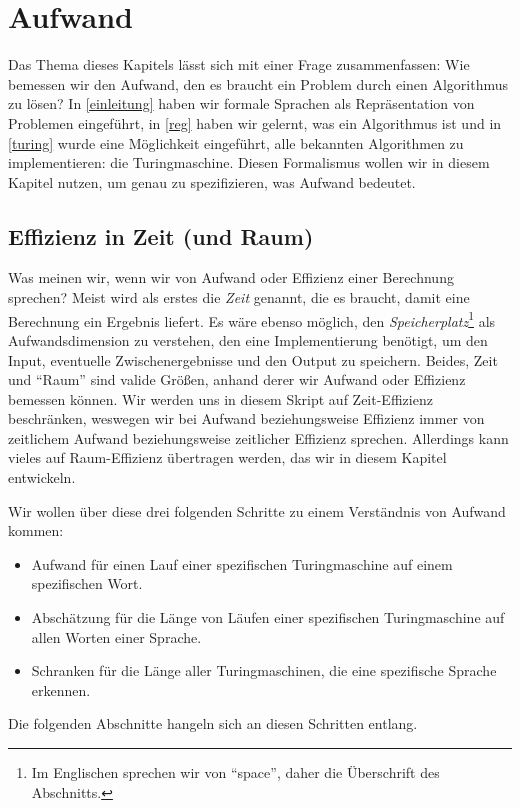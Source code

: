 \chapter{Aufwand}
Das Thema dieses Kapitels lässt sich mit einer Frage zusammenfassen:
Wie bemessen wir den Aufwand,
den es braucht ein Problem durch einen Algorithmus zu lösen?
In \autoref{einleitung} haben wir formale Sprachen als Repräsentation von Problemen eingeführt,
in \autoref{reg} haben wir gelernt, was ein Algorithmus ist und
in \autoref{turing} wurde eine Möglichkeit eingeführt,
alle bekannten Algorithmen zu implementieren:
die Turingmaschine.
Diesen Formalismus wollen wir in diesem Kapitel nutzen,
um genau zu spezifizieren,
was Aufwand bedeutet.

\section{Effizienz in Zeit (und Raum)}

Was meinen wir, wenn wir von Aufwand oder Effizienz einer Berechnung sprechen?
Meist wird als erstes die \emph{Zeit} genannt,
die es braucht,
damit eine Berechnung ein Ergebnis liefert.
Es wäre ebenso möglich,
den \emph{Speicherplatz}\footnote{
    Im Englischen sprechen wir von ``space'', daher die Überschrift des Abschnitts.}
als Aufwandsdimension zu verstehen,
den eine Implementierung benötigt,
um den Input,
eventuelle Zwischenergebnisse
und den Output zu speichern.
Beides, Zeit und ``Raum'' sind valide Größen,
anhand derer wir Aufwand oder Effizienz bemessen können.
Wir werden uns in diesem Skript auf Zeit-Effizienz beschränken,
weswegen wir bei Aufwand beziehungsweise Effizienz immer von
zeitlichem Aufwand beziehungsweise zeitlicher Effizienz sprechen.
Allerdings kann vieles auf Raum-Effizienz übertragen werden,
das wir in diesem Kapitel entwickeln.

Wir wollen über diese drei folgenden Schritte zu einem Verständnis von Aufwand kommen:
\begin{itemize}
    \item Aufwand für einen Lauf einer spezifischen Turingmaschine auf einem spezifischen Wort.
    \item Abschätzung für die Länge von Läufen einer spezifischen Turingmaschine
        auf allen Worten einer Sprache.
    \item Schranken für die Länge aller Turingmaschinen, die eine spezifische Sprache erkennen.
\end{itemize}

Die folgenden Abschnitte hangeln sich an diesen Schritten entlang.


